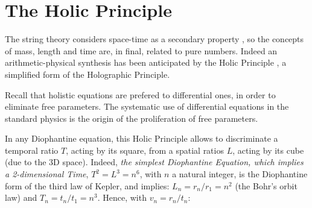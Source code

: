 \documentclass[a4paper,9pt]{article}
\begin{document}
 
 
 
\section{The Holic Principle}

The string theory considers space-time as a secondary property \cite{Seiberg}, so the concepts of mass, length and time are, in final, related to pure numbers. Indeed an arithmetic-physical synthesis has been anticipated by the Holic Principle  \cite{Sanchez1}, a simplified form of the Holographic Principle. 

Recall that holistic equations are prefered to differential ones, in order to eliminate free parameters. 
The systematic use of differential equations in the standard physics is the origin of the proliferation of free parameters. 


In any Diophantine equation, this Holic Principle allows to discriminate a temporal ratio $T$, acting by its square, from a spatial ratios $L$, acting by its cube (due to the 3D space). Indeed, \textit {the simplest Diophantine Equation, which implies a 2-dimensional Time}, $T^2 = L^3 = n^6$, with $n$ a natural integer, is the Diophantine form of the third law of Kepler, and implies: $L_n = r_n /r_1 = n^2$ (the Bohr's orbit law) and $T_n = t_n/t_1 = n^3$. Hence, with $v_n = r_n/t_ n$:
\end{document}
